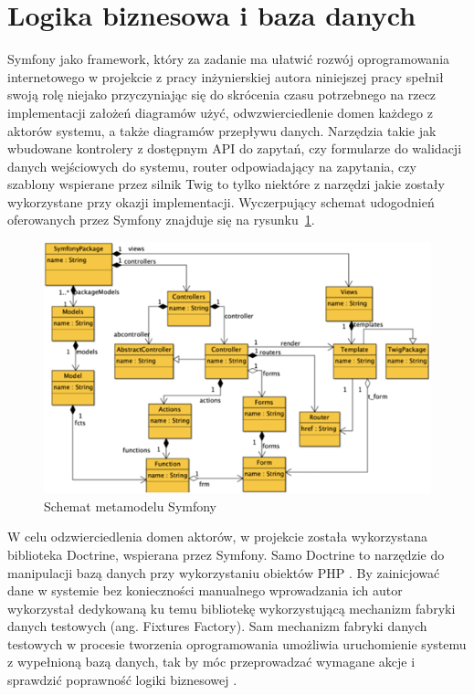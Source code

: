 \documentclass[12pt,twoside]{book}
\newcommand{\captionvspace}{\vspace{6pt}}
\begin{document}
    \section{Logika biznesowa i baza danych}

    Symfony jako framework, który za zadanie ma ułatwić rozwój oprogramowania internetowego w projekcie z pracy inżynierskiej autora niniejszej pracy spełnił swoją rolę niejako przyczyniając się do skrócenia czasu potrzebnego na rzecz implementacji założeń diagramów użyć, odwzwierciedlenie domen każdego z aktorów systemu, a także diagramów przepływu danych. Narzędzia takie jak wbudowane kontrolery z dostępnym API do zapytań, czy formularze do walidacji danych wejściowych do systemu, router odpowiadający na zapytania, czy szablony wspierane przez silnik Twig to tylko niektóre z narzędzi jakie zostały wykorzystane przy okazji implementacji. Wyczerpujący schemat udogodnień oferowanych przez Symfony znajduje się na rysunku~\ref{fig:symfony-metadata-scheme}.

    \begin{figure}[ht]
        \centering
        \includegraphics[width=\textwidth]{includes/images/symfony-metadata-scheme.png}
        \captionvspace
        \caption{Schemat metamodelu Symfony \cite{mod.driv.arch.symf}}
        \label{fig:symfony-metadata-scheme}
    \end{figure}

    W celu odzwierciedlenia domen aktorów, w projekcie została wykorzystana biblioteka Doctrine, wspierana przez Symfony. Samo Doctrine to narzędzie do manipulacji bazą danych przy wykorzystaniu obiektów PHP \cite{symf.5}. By zainicjować dane w systemie bez konieczności manualnego wprowadzania ich autor wykorzystał dedykowaną ku temu bibliotekę wykorzystującą mechanizm fabryki danych testowych (ang. Fixtures Factory). Sam mechanizm fabryki danych testowych w procesie tworzenia oprogramowania umożliwia uruchomienie systemu z wypełnioną bazą danych, tak by móc przeprowadzać wymagane akcje i sprawdzić poprawność logiki biznesowej \cite{fixtures}.
\end{document}
